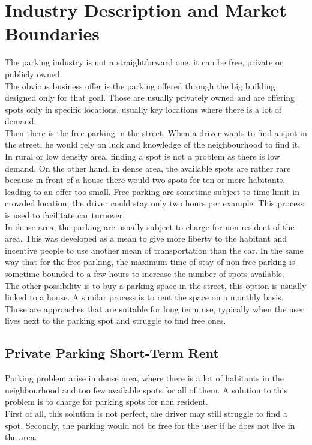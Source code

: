 \documentclass[12pt,a4paper,oneside]{book}
\begin{document}
\section{Industry Description and Market Boundaries}
The parking industry is not a straightforward one, it can be free, private or publicly owned.\\
The obvious business offer is the parking offered through the big building designed only for that goal. Those are usually privately owned and are offering spots only in specific locations, usually key locations where there is a lot of demand.\\
Then there is the free parking in the street. When a driver wants to find a spot in the street, he would rely on luck and knowledge of the neighbourhood to find it. In rural or low density area, finding a spot is not a problem as there is low demand. On the other hand, in dense area, the available spots are rather rare because in front of a house there would two spots for ten or more habitants, leading to an offer too small. Free parking are sometime subject to time limit in crowded location, the driver could stay only two hours per example. This process is used to facilitate car turnover.\\
In dense area, the parking are usually subject to charge for non resident of the area. This was developed as a mean to give more liberty to the habitant and incentive people to use another mean of transportation than the car.\cite{nycar} In the same way that for the free parking, the maximum time of stay of non free parking is sometime bounded to a few hours to increase the number of spots available.\cite{bxpay} \\
The other possibility is to buy a parking space in the street, this option is usually linked to a house. A similar process is to rent the space on a monthly basis. Those are approaches that are suitable for long term use, typically when the user lives next to the parking spot and struggle to find free ones.

\subsection{Private Parking Short-Term Rent}
Parking problem arise in dense area, where there is a lot of habitants in the neighbourhood and too few available spots for all of them. A solution to this problem is to charge for parking spots for non resident.\\
First of all, this solution is not perfect, the driver may still struggle to find a spot. Secondly, the parking would not be free for the user if he does not live in the area.\\
\end{document}
